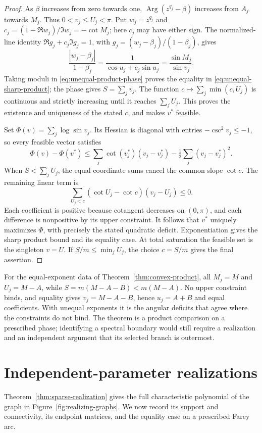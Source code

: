 \documentclass[11pt,a4paper]{article}
\theoremstyle{definition}
\theoremstyle{remark}
\numberwithin{equation}{section}
\begin{document}
\begin{proof}
As $\beta$ increases from zero towards one,
$\operatorname{Arg}(z^{q_j}-\beta)$ increases from $A_j$ towards $M_j$.
Thus $0<v_j\le U_j<\pi$. Put $w_j=z^{q_j}$ and
$c_j=(1-\Re w_j)/\Im w_j=-\cot M_j$; here $c_j$ may have either sign.
The normalized-line identity
$\Re g_j+c_j\Im g_j=1$, with $g_j=(w_j-\beta_j)/(1-\beta_j)$,
gives
\[
 \frac{|w_j-\beta_j|}{1-\beta_j}
       =\frac1{\cos u_j+c_j\sin u_j}
       =\frac{\sin M_j}{\sin v_j}.
\]
Taking moduli in \eqref{eq:unequal-product-phase} proves the equality in
\eqref{eq:unequal-sharp-product}; the phase gives $S=\sum_jv_j$.
The function $c\mapsto\sum_j\min(c,U_j)$ is continuous and strictly increasing
until it reaches $\sum_jU_j$. This proves the existence and uniqueness of
the stated $c$, and makes $v^*$ feasible.

Set $\Phi(v)=\sum_j\log\sin v_j$. Its Hessian is diagonal with entries
$-\csc^2v_j\le-1$, so every feasible vector satisfies
\[
 \Phi(v)-\Phi(v^*)
 \le\sum_j\cot(v_j^*)(v_j-v_j^*)
                          -\tfrac12\sum_j(v_j-v_j^*)^2.
\]
When $S<\sum_jU_j$, the equal coordinate sums cancel the common slope
$\cot c$. The remaining linear term is
\[
 \sum_{U_j<c}(\cot U_j-\cot c)(v_j-U_j)\le0.
\]
Each coefficient is positive because cotangent decreases on $(0,\pi)$,
and each difference is nonpositive by its upper constraint.
It follows that $v^*$ uniquely maximizes $\Phi$, with precisely the stated
quadratic deficit. Exponentiation gives the sharp product bound and its
equality case. At total saturation the feasible set is the singleton $v=U$.
If $S/m\le\min_jU_j$, the choice $c=S/m$ gives the final assertion.
\end{proof}

For the equal-exponent data of Theorem~\ref{thm:convex-product}, all $M_j=M$
and $U_j=M-A$, while
$S=m(M-A-B)<m(M-A)$. No upper constraint binds, and equality gives
$v_j=M-A-B$, hence $u_j=A+B$ and equal coefficients.
With unequal exponents it is the angular deficits that agree where the
constraints do not bind. The theorem is a product comparison on a prescribed
phase; identifying a spectral boundary would still require a realization
and an independent argument that its selected branch is outermost.


\section{Independent-parameter realizations}\label{app:matrix-family}
Theorem~\ref{thm:sparse-realization} gives the full characteristic
polynomial of the graph in Figure~\ref{fig:realizing-graphs}.
We now record its support and connectivity, its endpoint matrices,
and the equality case on a prescribed Farey arc.
\end{document}
